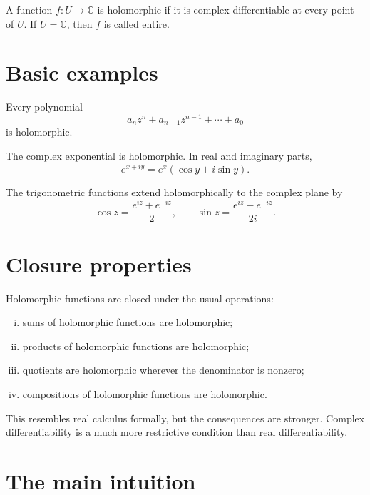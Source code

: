\begin{definition}
A function \(f:U\to\mathbb C\) is holomorphic if it is complex differentiable at every point of \(U\).  If \(U=\mathbb C\), then \(f\) is called entire.
\end{definition}

\section{Basic examples}

\begin{example}
Every polynomial
\[
  a_nz^n+a_{n-1}z^{n-1}+\cdots+a_0
\]
is holomorphic.
\end{example}

\begin{example}
The complex exponential is holomorphic.  In real and imaginary parts,
\[
  e^{x+iy}=e^x(\cos y+i\sin y).
\]
\end{example}

\begin{example}
The trigonometric functions extend holomorphically to the complex plane by
\[
  \cos z=\frac{e^{iz}+e^{-iz}}{2},
  \qquad
  \sin z=\frac{e^{iz}-e^{-iz}}{2i}.
\]
\end{example}

\section{Closure properties}

Holomorphic functions are closed under the usual operations:
\begin{enumerate}[(i)]
  \item sums of holomorphic functions are holomorphic;
  \item products of holomorphic functions are holomorphic;
  \item quotients are holomorphic wherever the denominator is nonzero;
  \item compositions of holomorphic functions are holomorphic.
\end{enumerate}

\begin{remark}
This resembles real calculus formally, but the consequences are stronger.  Complex differentiability is a much more restrictive condition than real differentiability.
\end{remark}

\section{The main intuition}

